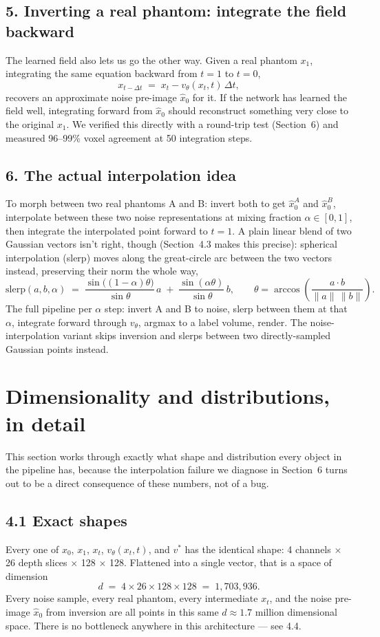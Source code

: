 \documentclass[11pt]{article}
\newcommand{\hsec}[1]{\section*{\color{hdrblue}#1}}
\newcommand{\hsub}[1]{\subsection*{#1}}
\begin{document}
\hsub{5. Inverting a real phantom: integrate the field backward}
The learned field also lets us go the other way. Given a real phantom $x_1$, integrating the
same equation backward from $t=1$ to $t=0$,
\begin{equation}
x_{t-\Delta t} \;=\; x_t - v_\theta(x_t,t)\,\Delta t, \label{eq:euler-bwd}
\end{equation}
recovers an approximate noise pre-image $\hat x_0$ for it. If the network has learned the
field well, integrating forward from $\hat x_0$ should reconstruct something very close to
the original $x_1$. We verified this directly with a round-trip test (Section~6) and measured
96--99\% voxel agreement at 50 integration steps.

\hsub{6. The actual interpolation idea}
To morph between two real phantoms A and B: invert both to get $\hat x_0^A$ and
$\hat x_0^B$, interpolate between these two noise representations at mixing fraction
$\alpha \in [0,1]$, then integrate the interpolated point forward to $t=1$. A plain linear
blend of two Gaussian vectors isn't right, though (Section~4.3 makes this precise): spherical
interpolation (slerp) moves along the great-circle arc between the two vectors instead,
preserving their norm the whole way,
\begin{equation}
\mathrm{slerp}(a,b,\alpha) \;=\; \frac{\sin\big((1-\alpha)\theta\big)}{\sin\theta}\,a \;+\;
\frac{\sin(\alpha\theta)}{\sin\theta}\,b, \qquad \theta = \arccos\!\left(\frac{a\cdot b}{\|a\|\,\|b\|}\right).
\label{eq:slerp}
\end{equation}
The full pipeline per $\alpha$ step: invert A and B to noise, slerp between them at that
$\alpha$, integrate forward through $v_\theta$, argmax to a label volume, render. The
noise-interpolation variant skips inversion and slerps between two directly-sampled Gaussian
points instead.

\hsec{Dimensionality and distributions, in detail}
This section works through exactly what shape and distribution every object in the pipeline
has, because the interpolation failure we diagnose in Section~6 turns out to be a direct
consequence of these numbers, not of a bug.

\hsub{4.1 Exact shapes}
Every one of $x_0$, $x_1$, $x_t$, $v_\theta(x_t,t)$, and $v^*$ has the identical shape: 4
channels $\times$ 26 depth slices $\times$ 128 $\times$ 128. Flattened into a single vector,
that is a space of dimension
\begin{equation}
d \;=\; 4 \times 26 \times 128 \times 128 \;=\; 1{,}703{,}936. \label{eq:dim}
\end{equation}
Every noise sample, every real phantom, every intermediate $x_t$, and the noise pre-image
$\hat x_0$ from inversion are all points in this same $d \approx 1.7$ million dimensional
space. There is no bottleneck anywhere in this architecture --- see 4.4.
\end{document}
